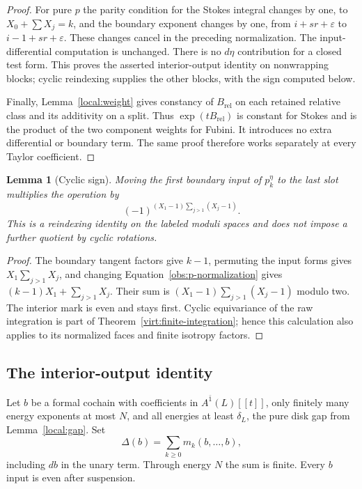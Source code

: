 \documentclass[11pt]{article}
\newtheorem{lemma}[theorem]{Lemma}
\theoremstyle{definition}
\theoremstyle{remark}
\numberwithin{equation}{section}
\begin{document}
\begin{proof}
For pure $p$ the parity condition for the Stokes integral changes
by one, to $X_0+\sum X_j=k$, and the boundary exponent changes by
one, from $i+sr+\varepsilon$ to
$i-1+sr+\varepsilon$.  These changes cancel in the preceding
normalization.  The input-differential computation is unchanged.
There is no $d\eta$ contribution for a closed test form.  This
proves the asserted interior-output identity on nonwrapping
blocks; cyclic reindexing supplies the other blocks, with the
sign computed below.

Finally, Lemma~\ref{local:weight} gives constancy of
$B_{\mathrm{rel}}$ on each retained relative class and its
additivity on a split.  Thus
$\exp(tB_{\mathrm{rel}})$ is constant for Stokes and is the
product of the two component weights for Fubini.  It introduces
no extra differential or boundary term.  The same proof therefore
works separately at every Taylor coefficient.
\end{proof}

\begin{lemma}[Cyclic sign]\label{obs:cyclic}
Moving the first boundary input of $p_k^\eta$ to the last slot
multiplies the operation by
\begin{equation}
 \label{obs:cyclic-sign}
 (-1)^{(X_1-1)\sum_{j>1}(X_j-1)}.
\end{equation}
This is a reindexing identity on the labeled moduli spaces and
does not impose a further quotient by cyclic rotations.
\end{lemma}

\begin{proof}
The boundary tangent factors give $k-1$, permuting the input
forms gives $X_1\sum_{j>1}X_j$, and changing
Equation~\eqref{obs:p-normalization} gives
$(k-1)X_1+\sum_{j>1}X_j$.  Their sum is
$(X_1-1)\sum_{j>1}(X_j-1)$ modulo two.  The interior mark is even
and stays first.  Cyclic equivariance of the raw integration is
part of Theorem~\ref{virt:finite-integration}; hence this
calculation also applies to its normalized faces and finite
isotropy factors.
\end{proof}

\subsection{The interior-output identity}

Let $b$ be a formal cochain with coefficients in
$A^{\bar1}(L)[[t]]$, only finitely many energy exponents at
most $N$, and all energies at least $\delta_L$, the pure
disk gap from Lemma~\ref{local:gap}.  Set
\begin{equation}
 \label{obs:curvature}
 \Delta(b)=\sum_{k\ge0}m_k(b,\ldots,b),
\end{equation}
including $db$ in the unary term.  Through energy $N$ the
sum is finite.  Every $b$ input is even after suspension.
\end{document}
